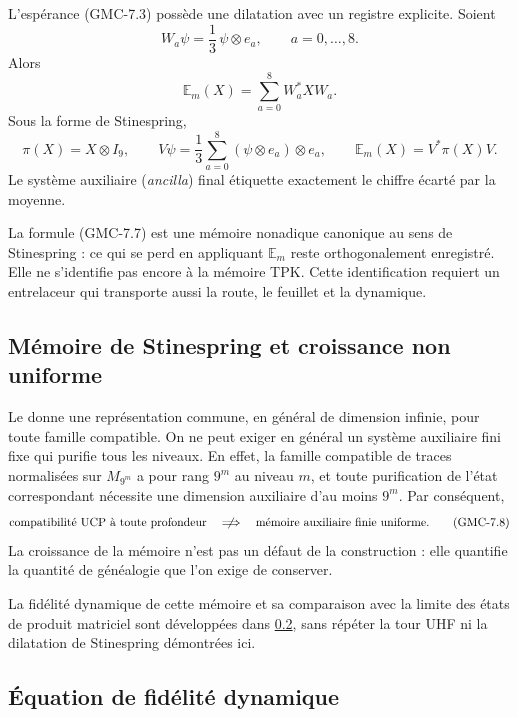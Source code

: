 L'espérance \textup{(GMC-7.3)} possède une dilatation avec un registre explicite. Soient
\[
 W_a\psi=\frac13\,\psi\otimes e_a,
 \qquad a=0,\ldots,8.
 \]
Alors
\[
 \mathbb E_m(X)=\sum_{a=0}^8W_a^*XW_a.
 \tag{GMC-7.6}
\]
Sous la forme de Stinespring,
\[
 \pi(X)=X\otimes I_9,
 \qquad
 V\psi=\frac13\sum_{a=0}^8(\psi\otimes e_a)\otimes e_a,
 \qquad
 \mathbb E_m(X)=V^*\pi(X)V.
 \tag{GMC-7.7}
\]
Le système auxiliaire (\emph{ancilla}) final étiquette exactement le chiffre écarté par la moyenne.

\begin{bridgebox}
La formule \textup{(GMC-7.7)} est une mémoire nonadique canonique au sens de
Stinespring : ce qui se perd en appliquant $\mathbb E_m$ reste orthogonalement
enregistré. Elle ne s'identifie pas encore à la mémoire TPK. Cette identification
requiert un entrelaceur qui transporte aussi la route, le feuillet et la dynamique.
\end{bridgebox}

\subsection{Mémoire de Stinespring et croissance non uniforme}
\label{p12-83-c22-s7:gmc:sec:memoria-no-uniforme}

Le  donne une représentation commune, en général
de dimension infinie, pour toute famille compatible. On ne peut exiger en
général un système auxiliaire fini fixe qui purifie tous les niveaux. En effet, la
famille compatible de traces normalisées sur $M_{9^m}$ a pour rang $9^m$ au
niveau $m$, et toute purification de l'état correspondant nécessite
une dimension auxiliaire d'au moins $9^m$. Par conséquent,
\[
 \text{compatibilité UCP à toute profondeur}
 \quad\centernot\Longrightarrow\quad
 \text{mémoire auxiliaire finie uniforme}.
 \tag{GMC-7.8}
\]
La croissance de la mémoire n'est pas un défaut de la construction : elle quantifie la
quantité de généalogie que l'on exige de conserver.

La fidélité dynamique de cette mémoire et sa comparaison avec la limite des
états de produit matriciel sont développées dans
\cref{p12-83-c22-s7:gmc:sec:fidelidad-dinamica}, sans répéter la tour UHF ni la dilatation
de Stinespring démontrées ici.
\fi

\ifdefined\HMTGMCContinuumMPS
\subsection{Équation de fidélité dynamique}
\label{p12-83-c22-s7:gmc:sec:fidelidad-dinamica}

